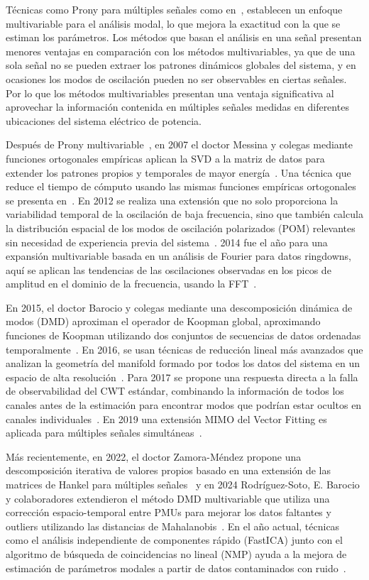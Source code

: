 Técnicas como Prony para múltiples señales como en~\cite{Trudnowski1999}, establecen un enfoque multivariable para el análisis modal, lo que mejora la exactitud con la que se estiman los parámetros. Los métodos que basan el análisis en una señal presentan menores ventajas en comparación con los métodos multivariables, ya que de una sola señal no se pueden extraer los patrones dinámicos globales del sistema, y en ocasiones los modos de oscilación pueden no ser observables en ciertas señales. Por lo que los métodos multivariables presentan una ventaja significativa al aprovechar la información contenida en múltiples señales medidas en diferentes ubicaciones del sistema eléctrico de potencia.

Después de Prony multivariable~\cite{Trudnowski1999}, en 2007 el doctor Messina y colegas mediante funciones ortogonales empíricas aplican la SVD a la matriz de datos para extender los patrones propios y temporales de mayor energía~\cite{Messina2007}. Una técnica que reduce el tiempo de cómputo usando las mismas funciones empíricas ortogonales se presenta en~\cite{Esquivel2015}. En 2012 se realiza una extensión que no solo proporciona la variabilidad temporal de la oscilación de baja frecuencia, sino que también calcula la distribución espacial de los modos de oscilación polarizados (POM) relevantes sin necesidad de experiencia previa del sistema~\cite{Yang2012}. 2014 fue el año para una expansión multivariable basada en un análisis de Fourier para datos ringdowns, aquí se aplican las tendencias de las oscilaciones observadas en los picos de amplitud en el dominio de la frecuencia, usando la FFT~\cite{Tashman2014}.

En 2015, el doctor Barocio y colegas mediante una descomposición dinámica de modos (DMD) aproximan el operador de Koopman global, aproximando funciones de Koopman utilizando dos conjuntos de secuencias de datos ordenadas temporalmente~\cite{Barocio2015}. En 2016, se usan técnicas de reducción lineal más avanzados que analizan la geometría del manifold formado por todos los datos del sistema en un espacio de alta resolución~\cite{Arvizu2016}. Para 2017 se propone una respuesta directa a la falla de observabilidad del CWT estándar, combinando la información de todos los canales antes de la estimación para encontrar modos que podrían estar ocultos en canales individuales~\cite{Li2018}. En 2019 una extensión MIMO del Vector Fitting es aplicada para múltiples señales simultáneas~\cite{Schumacher2019, Banuelos2019}.

Más recientemente, en 2022, el doctor Zamora-Méndez propone una descomposición iterativa de valores propios basado en una extensión de las matrices de Hankel para múltiples señales~\cite{Zamora2024} y en 2024 Rodríguez-Soto, E. Barocio y colaboradores extendieron el método DMD multivariable que utiliza una corrección espacio-temporal entre PMUs para mejorar los datos faltantes y outliers utilizando las distancias de Mahalanobis~\cite{Rodriguez2024}. En el año actual, técnicas como el análisis independiente de componentes rápido (FastICA) junto con el algoritmo de búsqueda de coincidencias no lineal (NMP) ayuda a la mejora de estimación de parámetros modales a partir de datos contaminados con ruido~\cite{Wang2025}.

